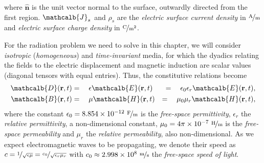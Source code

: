 where $\hat{\mathbf{n}}$ is the unit vector normal to the surface, outwardly directed from the first region. $\mathcalb{J}_s$ and $\rho_s$ are the \textit{electric surface current density} in $\mathrm{\nicefrac{\mathrm A}{\mathrm m}}$ and \textit{electric surface charge density} in $\mathrm{\nicefrac{\mathrm C}{m^2}}$. %

\par For the radiation problem we need to solve in this chapter, we will consider \textit{isotropic} (\textit{homogeneous}) and \textit{time-invariant} media, for which the dyadics relating the fields to the electric displacement and magnetic induction are scalar values (diagonal tensors with equal entries). Thus, the constitutive relations become
\begin{eqnarray} 
\mathcalb{D}(\mathbf{r},t) &= \ \ \ \epsilon \mathcalb{E}(\mathbf{r},t) &= \ \ \ \epsilon_0 \epsilon_r \mathcalb{E}(\mathbf{r},t),  \label{eq:fsconst1}\\
\mathcalb{B}(\mathbf{r},t) &= \ \ \ \mu \mathcalb{H}(\mathbf{r},t)  &= \ \ \ \mu_0 \mu_r \mathcalb{H}(\mathbf{r},t), \label{eq:fsconst2}
\end{eqnarray}
where the constant $\epsilon_0 = 8.854 \times 10^{-12} \ \mathrm{\nicefrac{\mathrm F}{\mathrm m}}$ is the \textit{free-space permittivity}, $\epsilon_r$ the \textit{relative permittivity}, a non-dimensional constant, $\mu_0 = 4\pi \times 10^{-7} \ \mathrm{\nicefrac{\mathrm H}{\mathrm m}}$ is the \textit{free-space permeability} and $\mu_r$ the \textit{relative permeability}, also non-dimensional. As we expect electromagnetic waves to be propagating, we denote their speed as  $c = \nicefrac{1}{\sqrt{\epsilon \mu}} = \nicefrac{c_0}{\sqrt{\epsilon_r \mu_r}}$ with $c_0  \approx 2.998 \times 10^{8} \ \mathrm{\nicefrac{\mathrm m}{s}}$ the \textit{free-space speed of light}.

